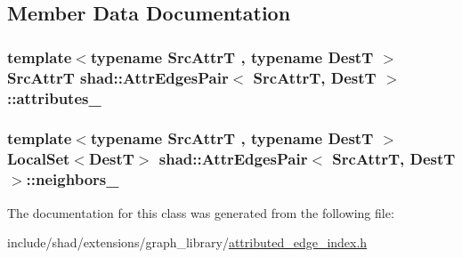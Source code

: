 \subsection{Member Data Documentation}
\hypertarget{classshad_1_1AttrEdgesPair_a6296cb2ead29362d2a52f3c5ccef58a1}{
\subsubsection[{attributes\-\_\-}]{\setlength{\rightskip}{0pt plus 5cm}template$<$typename Src\-Attr\-T , typename Dest\-T $>$ Src\-Attr\-T {\bf shad\-::\-Attr\-Edges\-Pair}$<$ Src\-Attr\-T, Dest\-T $>$\-::attributes\-\_\-}}\label{classshad_1_1AttrEdgesPair_a6296cb2ead29362d2a52f3c5ccef58a1}
\hypertarget{classshad_1_1AttrEdgesPair_a2c1c5d3fac6714fdbff5d0edabf0b334}{
\subsubsection[{neighbors\-\_\-}]{\setlength{\rightskip}{0pt plus 5cm}template$<$typename Src\-Attr\-T , typename Dest\-T $>$ {\bf Local\-Set}$<$Dest\-T$>$ {\bf shad\-::\-Attr\-Edges\-Pair}$<$ Src\-Attr\-T, Dest\-T $>$\-::neighbors\-\_\-}}\label{classshad_1_1AttrEdgesPair_a2c1c5d3fac6714fdbff5d0edabf0b334}


The documentation for this class was generated from the following file\-:\begin{DoxyCompactItemize}
\item 
include/shad/extensions/graph\-\_\-library/\hyperlink{attributed__edge__index_8h}{attributed\-\_\-edge\-\_\-index.\-h}\end{DoxyCompactItemize}
